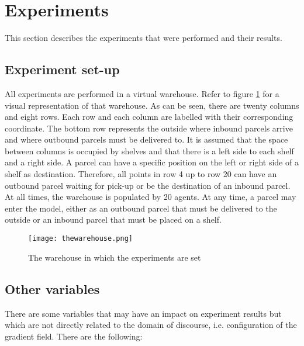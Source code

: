 \section{Experiments}\label{sec:experiments}
This section describes the experiments that were performed and their results.

\subsection{Experiment set-up}\label{sec:setup}
All experiments are performed in a virtual warehouse. Refer to figure \ref{fig:thewarehouse} for a visual representation of that warehouse. As can be seen, there are twenty columns and eight rows. Each row and each column are labelled with their corresponding coordinate. The bottom row represents the outside where inbound parcels arrive and where outbound parcels must be delivered to. It is assumed that the space between columns is occupied by shelves and that there is a left side to each shelf and a right side. A parcel can have a specific position on the left or right side of a shelf as destination. Therefore, all points in row 4 up to row 20 can have an outbound parcel waiting for pick-up or be the destination of an inbound parcel. At all times, the warehouse is populated by 20 agents. At any time, a parcel may enter the model, either as an outbound parcel that must be delivered to the outside or an inbound parcel that must be placed on a shelf.

\begin{figure}[H]
    \centering
    \texttt{[image: thewarehouse.png]}
    \caption{The warehouse in which the experiments are set}
    \label{fig:thewarehouse}
\end{figure}

\subsection{Other variables}
There are some variables that may have an impact on experiment results but which are not directly related to the domain of discourse, i.e. configuration of the gradient field. There are the following:

